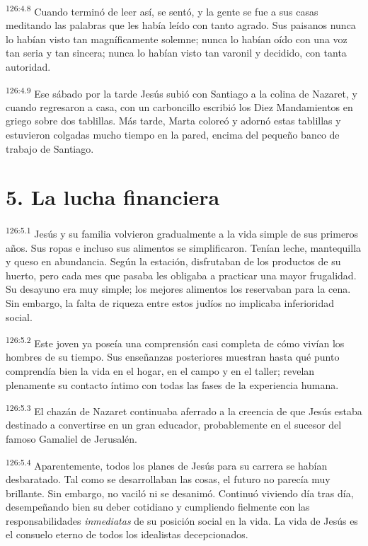 \par
\textsuperscript{126:4.8} Cuando terminó de leer así, se sentó, y la gente se fue a sus casas meditando las palabras que les había leído con tanto agrado. Sus paisanos nunca lo habían visto tan magníficamente solemne; nunca lo habían oído con una voz tan seria y tan sincera; nunca lo habían visto tan varonil y decidido, con tanta autoridad.

\par
\textsuperscript{126:4.9} Ese sábado por la tarde Jesús subió con Santiago a la colina de Nazaret, y cuando regresaron a casa, con un carboncillo escribió los Diez Mandamientos en griego sobre dos tablillas. Más tarde, Marta coloreó y adornó estas tablillas y estuvieron colgadas mucho tiempo en la pared, encima del pequeño banco de trabajo de Santiago.

\section*{5. La lucha financiera}
\par
\textsuperscript{126:5.1} Jesús y su familia volvieron gradualmente a la vida simple de sus primeros años. Sus ropas e incluso sus alimentos se simplificaron. Tenían leche, mantequilla y queso en abundancia. Según la estación, disfrutaban de los productos de su huerto, pero cada mes que pasaba les obligaba a practicar una mayor frugalidad. Su desayuno era muy simple; los mejores alimentos los reservaban para la cena. Sin embargo, la falta de riqueza entre estos judíos no implicaba inferioridad social.

\par
\textsuperscript{126:5.2} Este joven ya poseía una comprensión casi completa de cómo vivían los hombres de su tiempo. Sus enseñanzas posteriores muestran hasta qué punto comprendía bien la vida en el hogar, en el campo y en el taller; revelan plenamente su contacto íntimo con todas las fases de la experiencia humana.

\par
\textsuperscript{126:5.3} El chazán de Nazaret continuaba aferrado a la creencia de que Jesús estaba destinado a convertirse en un gran educador, probablemente en el sucesor del famoso Gamaliel de Jerusalén.

\par
\textsuperscript{126:5.4} Aparentemente, todos los planes de Jesús para su carrera se habían desbaratado. Tal como se desarrollaban las cosas, el futuro no parecía muy brillante. Sin embargo, no vaciló ni se desanimó. Continuó viviendo día tras día, desempeñando bien su deber cotidiano y cumpliendo fielmente con las responsabilidades \textit{inmediatas} de su posición social en la vida. La vida de Jesús es el consuelo eterno de todos los idealistas decepcionados.

